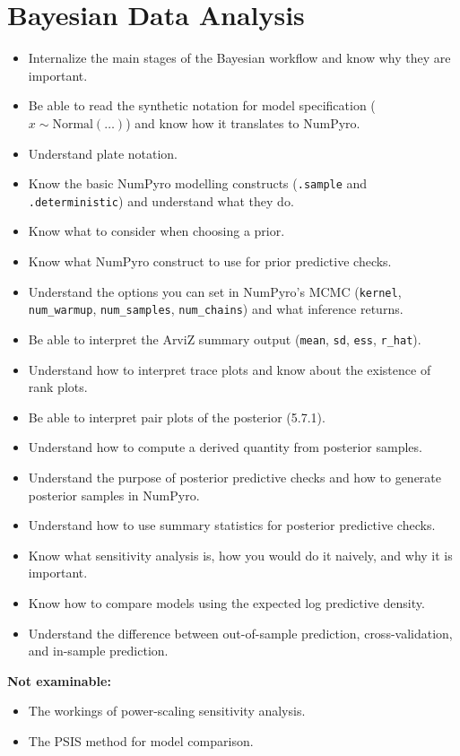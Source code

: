 \documentclass[11pt, a4paper]{article}
\newcommand{\notexaminable}[1]{%
  \begin{notebox}
    \footnotesize\textbf{Not examinable:}\vspace{2pt}
    \begin{itemize}[topsep=1pt, itemsep=1pt, leftmargin=1.2em]
      #1
    \end{itemize}
  \end{notebox}%
}
\begin{document}
\section{Bayesian Data Analysis}

\begin{itemize}
  \item Internalize the main stages of the Bayesian workflow and know why they are important.
  \item Be able to read the synthetic notation for model specification
        ($x \sim \text{Normal}(\ldots)$) and know how it translates to NumPyro.
  \item Understand plate notation.
  \item Know the basic NumPyro modelling constructs (\texttt{.sample} and \texttt{.deterministic}) and understand what they do.
  \item Know what to consider when choosing a prior.
  \item Know what NumPyro construct to use for prior predictive checks.
  \item Understand the options you can set in NumPyro's MCMC
        (\texttt{kernel}, \texttt{num\_warmup}, \texttt{num\_samples}, \texttt{num\_chains})
        and what inference returns.
  \item Be able to interpret the ArviZ summary output
        (\texttt{mean}, \texttt{sd}, \texttt{ess}, \texttt{r\_hat}).
  \item Understand how to interpret trace plots and know about the existence of rank plots.
  \item Be able to interpret pair plots of the posterior (5.7.1).
  \item Understand how to compute a derived quantity from posterior samples.
  \item Understand the purpose of posterior predictive checks and how to generate posterior samples in NumPyro.
  \item Understand how to use summary statistics for posterior predictive checks.
  \item Know what sensitivity analysis is, how you would do it naively, and why it is important.
  \item Know how to compare models using the expected log predictive density.
  \item Understand the difference between out-of-sample prediction, cross-validation, and in-sample prediction.
\end{itemize}

\notexaminable{
  \item The workings of power-scaling sensitivity analysis.
  \item The PSIS method for model comparison.
}
\end{document}
